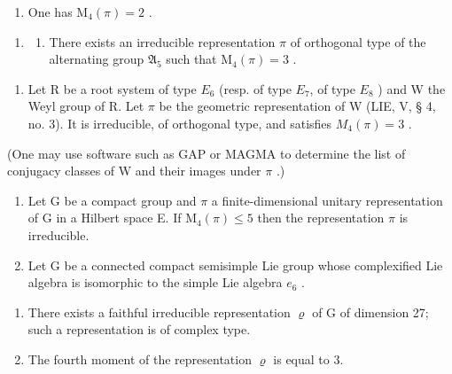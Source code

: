 \begin{enumerate}
\def\labelenumi{\alph{enumi})}
\setcounter{enumi}{2}
\tightlist
\item
  One has \(\mathrm{M}_4(\pi) = 2\) .
\end{enumerate}

\begin{enumerate}
\def\labelenumi{\arabic{enumi})}
\setcounter{enumi}{9}
\tightlist
\item
  \begin{enumerate}
  \def\labelenumii{\alph{enumii})}
  \tightlist
  \item
    There exists an irreducible representation \(\pi\) of orthogonal type of the alternating group \(\mathfrak{A}_5\) such that \(\mathrm{M}_4(\pi) = 3\) .
  \end{enumerate}
\end{enumerate}

\begin{enumerate}
\def\labelenumi{\alph{enumi})}
\setcounter{enumi}{1}
\tightlist
\item
  Let R be a root system of type \(E_{6}\) (resp. of type \(E_{7}\), of type \(E_{8}\) ) and W the Weyl group of R. Let \(\pi\) be the geometric representation of W (LIE, V, § 4, no. 3). It is irreducible, of orthogonal type, and satisfies \(M_{4}(\pi)=3\) .
\end{enumerate}

(One may use software such as GAP or MAGMA to determine the list of conjugacy classes of W and their images under \(\pi\) .)

\begin{enumerate}
\def\labelenumi{\arabic{enumi})}
\setcounter{enumi}{10}
\item
  Let G be a compact group and \(\pi\) a finite-dimensional unitary representation of G in a Hilbert space E. If \(\mathrm{M}_{4}(\pi) \leqslant 5\) then the representation \(\pi\) is irreducible.
\item
  Let G be a connected compact semisimple Lie group whose complexified Lie algebra is isomorphic to the simple Lie algebra \(e_{6}\) .
\end{enumerate}

\begin{enumerate}
\def\labelenumi{\alph{enumi})}
\item
  There exists a faithful irreducible representation \(\varrho\) of G of dimension 27; such a representation is of complex type.
\item
  The fourth moment of the representation \(\varrho\) is equal to 3.
\end{enumerate}

